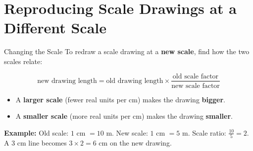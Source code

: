 \section{Reproducing Scale Drawings at a Different Scale}

\begin{quickReview}{Changing the Scale}
To redraw a scale drawing at a \textbf{new scale}, find how the two scales relate:

$$\text{new drawing length} = \text{old drawing length} \times \frac{\text{old scale factor}}{\text{new scale factor}}$$

\begin{itemize}[leftmargin=*]
    \item A \textbf{larger scale} (fewer real units per cm) makes the drawing \textbf{bigger}.
    \item A \textbf{smaller scale} (more real units per cm) makes the drawing \textbf{smaller}.
\end{itemize}

\medskip
\textbf{Example:} Old scale: $1$ cm $= 10$ m. New scale: $1$ cm $= 5$ m. Scale ratio: $\frac{10}{5} = 2$. A $3$ cm line becomes $3 \times 2 = 6$ cm on the new drawing.
\end{quickReview}

